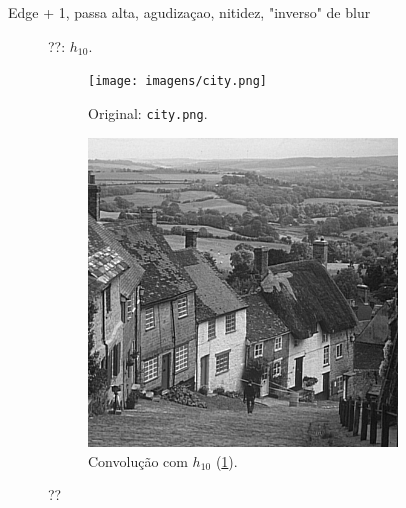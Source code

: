
Edge + 1, passa alta, agudizaçao, nitidez, "inverso" de blur

\begin{figure}[H]
    \centering
    

    \caption{??: $h_{10}$.}
    \label{fig:h10}
\end{figure}

\begin{figure}[H]
    \centering
    \begin{subfigure}{0.48\textwidth}
        \centering
        \texttt{[image: imagens/city.png]}
        \caption{Original: \texttt{city.png}.}
    \end{subfigure}%
    \begin{subfigure}{0.48\textwidth}
        \centering
        \includegraphics[width=0.9\textwidth]{resultados/city_h10.png}
        \caption{Convolução com $h_{10}$ (\ref{fig:h10}).}
    \end{subfigure}

    \caption{??}
\end{figure}
